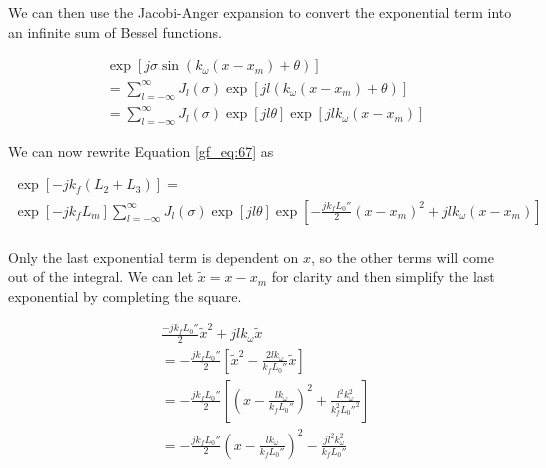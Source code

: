 We can then use the Jacobi-Anger expansion \cite{gbur_math} to convert the exponential term into an infinite sum of Bessel functions.

\begin{equation}
\begin{aligned}
& \exp\left[j\sigma \sin\left(k_{\omega} (x-x_m) + \theta\right) \right] \\ &=\sum_{l=-\infty}^{\infty}J_l(\sigma)\exp\left[jl(k_{\omega}(x-x_m) + \theta) \right] \\
&=\sum_{l=-\infty}^{\infty}J_l(\sigma)\exp\left[jl\theta\right]\exp\left[jlk_{\omega}(x-x_m)\right] 
\end{aligned}
\label{gf_eq:70}
\end{equation}
\renewcommand{\baselinestretch}{2} \small\normalsize

\noindent We can now rewrite Equation \ref{gf_eq:67} as

\begin{equation}
\begin{gathered}
\exp\left[-jk_f\left( L_2 + L_3\right) \right]= \\
\exp\left[-jk_fL_m\right]\sum_{l=-\infty}^{\infty}J_l(\sigma)\exp\left[jl\theta\right]
\exp\left[-\frac{jk_fL_0''}{2}(x-x_m)^2+jlk_{\omega}(x-x_m)\right]\\
\label{gf_eq:98}
\end{gathered}
\end{equation}
\renewcommand{\baselinestretch}{2} \small\normalsize

Only the last exponential term is dependent on $x$, so the other terms will come out of the integral. We can let $\tilde{x} = x-x_m$ for clarity and then simplify the last exponential by completing the square.

\begin{equation}
\begin{aligned}
&\frac{-jk_fL_0''}{2}\tilde{x}^2+jlk_{\omega}\tilde{x}\\
&=-\frac{jk_fL_0''}{2}\left[\tilde{x}^2 - \frac{2lk_{\omega}}{k_fL_0''}\tilde{x} \right]\\
&=-\frac{jk_fL_0''}{2}\left[\left(x-\frac{lk_{\omega}}{k_fL_0''} \right)^2 + \frac{l^2k_{\omega}^2}{k_f^2L_0''^2} \right]\\
&=-\frac{jk_fL_0''}{2}\left(x-\frac{lk_{\omega}}{k_fL_0''} \right)^2 - \frac{jl^2k_{\omega}^2}{k_fL_0''} 
\label{gf_eq:99}
\end{aligned}
\end{equation}
\renewcommand{\baselinestretch}{2} \small\normalsize

